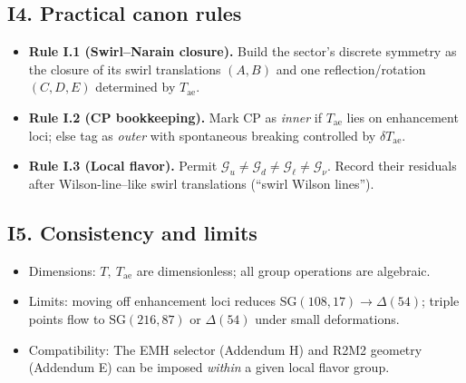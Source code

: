 \documentclass[11pt]{article}
\begin{document}
  \subsection*{I4. Practical canon rules}

  \begin{itemize}
  \item \textbf{Rule I.1 (Swirl–Narain closure).} Build the sector’s discrete symmetry as the closure of its swirl translations $(A,B)$ and one reflection/rotation $(C,D,E)$ determined by $T_{\text{ae}}$.
  \item \textbf{Rule I.2 (CP bookkeeping).} Mark CP as \emph{inner} if $T_{\text{ae}}$ lies on enhancement loci; else tag as \emph{outer} with spontaneous breaking controlled by $\delta T_{\text{ae}}$.
  \item \textbf{Rule I.3 (Local flavor).} Permit $\mathcal G_u\neq\mathcal G_d\neq\mathcal G_\ell\neq\mathcal G_\nu$. Record their residuals after Wilson-line–like swirl translations (“swirl Wilson lines”).
  \end{itemize}

  \subsection*{I5. Consistency and limits}

  \begin{itemize}
  \item Dimensions: $T,\ T_{\text{ae}}$ are dimensionless; all group operations are algebraic.
  \item Limits: moving off enhancement loci reduces $\mathrm{SG}(108,17)\to \Delta(54)$; triple points flow to $\mathrm{SG}(216,87)$ or $\Delta(54)$ under small deformations.
  \item Compatibility: The EMH selector (Addendum H) and R2M2 geometry (Addendum E) can be imposed \emph{within} a given local flavor group.
  \end{itemize}
\end{document}

